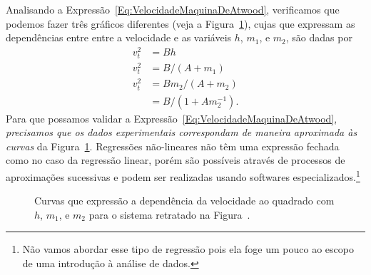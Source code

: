 Analisando a Expressão~\eqref{Eq:VelocidadeMaquinaDeAtwood}, verificamos que podemos fazer três gráficos diferentes (veja a Figura~\ref{Fig:GraficosVelEnergiaMecanica}), cujas que expressam as dependências entre entre a velocidade e as variáveis $h$, $m_1$, e $m_2$, são dadas por
\begin{align}
    v_t^2 &= B h \\
    v_t^2 &= B / (A + m_1) \\
    v_t^2 &= B m_2 / (A + m_2) \\
    &= B / (1 + A m_2^{-1}).
\end{align}
%
Para que possamos validar a Expressão~\eqref{Eq:VelocidadeMaquinaDeAtwood}, \emph{precisamos que os dados experimentais correspondam de maneira aproximada às curvas} da Figura~\ref{Fig:GraficosVelEnergiaMecanica}. Regressões não-lineares não têm uma expressão fechada como no caso da regressão linear, porém são possíveis através de processos de aproximações sucessivas e podem ser realizadas usando softwares especializados.\footnote[][-2cm]{Não vamos abordar esse tipo de regressão pois ela foge um pouco ao escopo de uma introdução à análise de dados.} 
\begin{figure}[!h]
\caption{Curvas que expressão a dependência da velocidade ao quadrado com $h$, $m_1$, e $m_2$ para o sistema retratado na Figura~\label{Fig:MaquinaAtwoodHorizEnergia}.\label{Fig:GraficosVelEnergiaMecanica}}
\end{figure}


